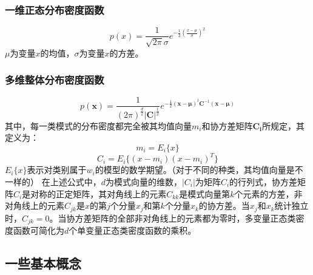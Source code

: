 \documentclass[12pt, letterpaper]{article}
\begin{document}
\subsubsection*{一维正态分布密度函数}
\begin{equation}
p(x)=\frac{1}{\sqrt{2\pi} \sigma}e^{-\frac{1}{2}(\frac{x-\mu}{\sigma})^2}
\end{equation}
$\mu$为变量$x$的均值，$\sigma$为变量$x$的方差。
\subsubsection*{多维整体分布密度函数}
\begin{equation}
p(\mathbf{x})=\frac{1}{(2\pi)^{\frac{d}{2}}|\mathbf{C}|^{\frac{1}{2}}}e^{-\frac{1}{2}(\mathbf{x}-\mathbf{\mu})^t\mathbf{C}^{-1}(\mathbf{x}-\mathbf{\mu})}
\end{equation}
其中，每一类模式的分布密度都完全被其均值向量$m_i$和协方差矩阵$\mathbf{C_i}$所规定，其定义为：
\begin{equation}
m_i=E_i\{x\}
\end{equation}
\begin{equation}
C_i=E_i\{(x-m_i)(x-m_i)^T\}
\end{equation}
$E_i\{x\}$表示对类别属于$w_i$的模型的数学期望。（对于不同的种类，其均值向量是不一样的）
在上述公式中，$d$为模式向量的维数，$|C_i|$为矩阵$C_i$的行列式，协方差矩阵$C_i$是对称的正定矩阵，其对角线上的元素$C_{kk}$是模式向量第$k$个元素的方差，非对角线上的元素$C_{jk}$是$x$的第$j$个分量$x_j$和第$k$个分量$x_k$的协方差。当$x_j$和$x_k$统计独立时，$C_{jk}=0$。当协方差矩阵的全部非对角线上的元素都为零时，多变量正态类密度函数可简化为$d$个单变量正态类密度函数的乘积。
\subsection{一些基本概念}
\end{document}
